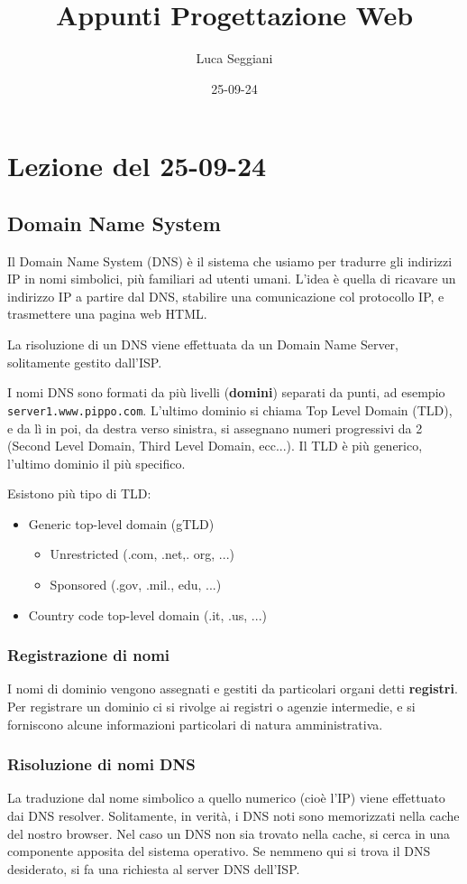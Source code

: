 \documentclass[a4paper,11pt]{article}
\title{Appunti Progettazione Web}
\author{Luca Seggiani}
\date{25-09-24}
\begin{document}
\section{Lezione del 25-09-24}

\thispagestyle{empty}
\pagestyle{fancy}

\subsection{Domain Name System}
Il Domain Name System (DNS) è il sistema che usiamo per tradurre gli indirizzi IP in nomi simbolici, più familiari ad utenti umani.
L'idea è quella di ricavare un indirizzo IP a partire dal DNS, stabilire una comunicazione col protocollo IP, e trasmettere una pagina web HTML.

La risoluzione di un DNS viene effettuata da un Domain Name Server, solitamente gestito dall'ISP.

I nomi DNS sono formati da più livelli (\textbf{domini}) separati da punti, ad esempio \texttt{server1.www.pippo.com}.
L'ultimo dominio si chiama Top Level Domain (TLD), e da lì in poi, da destra verso sinistra, si assegnano numeri progressivi da 2 (Second Level Domain, Third Level Domain, ecc...).
Il TLD è più generico, l'ultimo dominio il più specifico.

Esistono più tipo di TLD:
\begin{itemize}
	\item Generic top-level domain (gTLD)
		\begin{itemize}
			\item Unrestricted (.com, .net,. org, ...)
			\item Sponsored (.gov, .mil., edu, ...)
		\end{itemize}
	\item Country code top-level domain (.it, .us, ...)
\end{itemize}

\subsubsection{Registrazione di nomi}
I nomi di dominio vengono assegnati e gestiti da particolari organi detti \textbf{registri}.
Per registrare un dominio ci si rivolge ai registri o agenzie intermedie, e si forniscono alcune informazioni particolari di natura amministrativa.

\subsubsection{Risoluzione di nomi DNS}
La traduzione dal nome simbolico a quello numerico (cioè l'IP) viene effettuato dai DNS resolver.
Solitamente, in verità, i DNS noti sono memorizzati nella cache del nostro browser.
Nel caso un DNS non sia trovato nella cache, si cerca in una componente apposita del sistema operativo.
Se nemmeno qui si trova il DNS desiderato, si fa una richiesta al server DNS dell'ISP.
\end{document}
